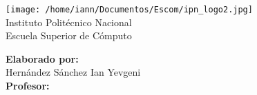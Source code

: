 \begin{titlepage}

\centering
\vspace*{3cm}
\texttt{[image: /home/iann/Documentos/Escom/ipn\_logo2.jpg]}\\[0.5cm]
\Large Instituto Politécnico Nacional\xspace\\
\Large Escuela Superior de Cómputo\xspace\\[0.3cm]
\vspace{1cm}
\Large \theassignment
\par

\huge\thetitle
\vfill

\large\flushright
\textbf{Elaborado por:}\\
Hernández Sánchez Ian Yevgeni\\[0.5cm]

\textbf{Profesor:}\\
\theteacher\\[1cm]
\vfill

\normalsize
\thedate

\end{titlepage}